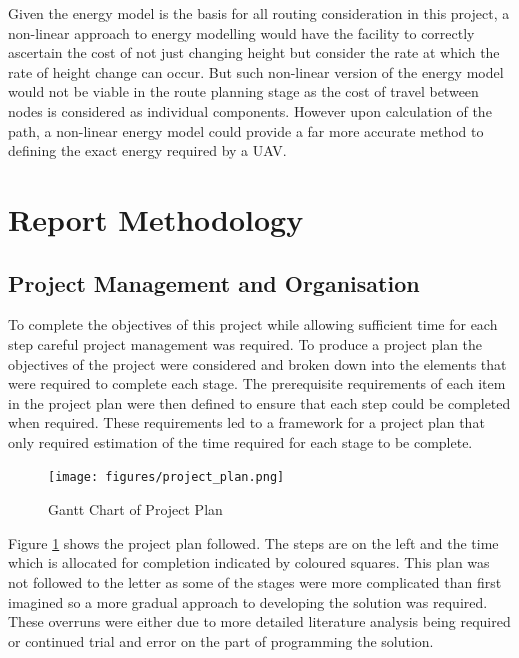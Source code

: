 \documentclass[a4paper,12pt,twoside]{article}
\begin{document}
Given the energy model is the basis for all routing consideration in this project, a non-linear approach to energy modelling would have the facility to correctly ascertain the cost of not just changing height but consider the rate at which the rate of height change can occur. But such non-linear version of the energy model would not be viable in the route planning stage as the cost of travel between nodes is considered as individual components. However upon calculation of the path, a non-linear energy model could provide a far more accurate method to defining the exact energy required by a UAV.

\section{Report Methodology}
\label{sec:report_methodology}

\subsection{Project Management and Organisation}
\label{sec:project_management_and_organisation}

To complete the objectives of this project while allowing sufficient time for each step careful project management was required. To produce a project plan the objectives of the project were considered and broken down into the elements that were required to complete each stage. The prerequisite requirements of each item in the project plan were then defined to ensure that each step could be completed when required. These requirements led to a framework for a project plan that only required estimation of the time required for each stage to be complete.

\begin{figure}[H]
\centering
\texttt{[image: figures/project\_plan.png]} 
\caption{Gantt Chart of Project Plan}
\label{fig:project_plan}
\end{figure}

Figure \ref{fig:project_plan} shows the project plan followed.  The steps are on the left and the time which is allocated for completion indicated by coloured squares. This plan was not followed to the letter as some of the stages were more complicated than first imagined so a more gradual approach to developing the solution was required. These overruns were either due to more detailed literature analysis being required or continued trial and error on the part of programming the solution.
\end{document}
